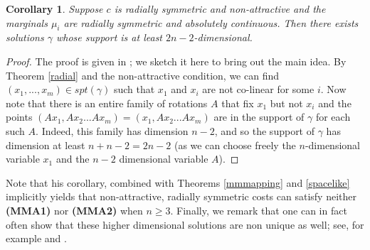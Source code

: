 \documentclass[letter,10pt]{article}
\theoremstyle{dotless}
\begin{document}
\newtheorem{highdnonattractive}[radial]{Corollary}
\begin{highdnonattractive}\label{highdnonattractive}
Suppose $c$ is radially symmetric and non-attractive and the marginals $\mu_i$ are radially symmetric and absolutely continuous.  Then there exists solutions $\gamma$ whose support is at least $2n-2$-dimensional.
\end{highdnonattractive}
\begin{proof}
The proof is given in \cite{P13b}; we sketch it here to bring out the main idea.
By Theorem \ref{radial} and the non-attractive condition, we can find $(x_1,...,x_m) \in spt(\gamma)$ such that $x_1$ and $x_i$ are not co-linear for some $i$.  Now note that there is an entire family of rotations $A$ that fix $x_1$ but not $x_i$ and the points $(Ax_1,Ax_2...Ax_m) =(x_1,Ax_2...Ax_m) $ are in the support of $\gamma$ for each such $A$.  Indeed, this family has dimension $n-2$, and so the support of $\gamma$ has dimension at least $n+n-2=2n-2$ (as we can choose freely the $n$-dimensional variable $x_1$ and the $n-2$ dimensional variable $A$).
\end{proof}
Note that his corollary, combined with Theorems \ref{mmmapping} and \ref{spacelike} implicitly yields that non-attractive, radially symmetric costs can satisfy neither \textbf{(MMA1)} nor \textbf{(MMA2)} when $n \geq 3$.
Finally, we remark that one can in fact often show that these higher dimensional solutions are non unique as well; see, for example \cite{CN} and \cite{P13b}.

 
\end{document}
